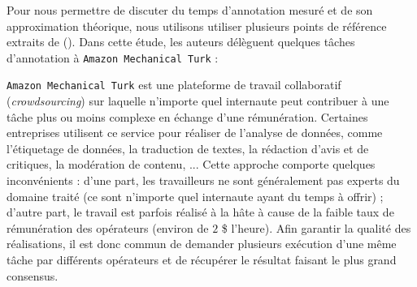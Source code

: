 			Pour nous permettre de discuter du temps d'annotation mesuré et de son approximation théorique, nous utilisons utiliser plusieurs points de référence extraits de (\cite{snow-etal:2008:cheap-fast-it}).
			Dans cette étude, les auteurs délèguent quelques tâches d'annotation à \texttt{Amazon Mechanical Turk} :
			
			\begin{leftBarInformation}
				\texttt{Amazon Mechanical Turk} est une plateforme de travail collaboratif (\textit{crowdsourcing}) sur laquelle n'importe quel internaute peut contribuer à une tâche plus ou moins complexe en échange d'une rémunération.
				Certaines entreprises utilisent ce service pour réaliser de l'analyse de données, comme l’étiquetage de données, la traduction de textes, la rédaction d'avis et de critiques, la modération de contenu, ...
				Cette approche comporte quelques inconvénients : d'une part, les travailleurs ne sont généralement pas experts du domaine traité (ce sont n'importe quel internaute ayant du temps  à offrir) ; d'autre part, le travail est parfois réalisé à la hâte à cause de la faible taux de rémunération des opérateurs (environ de $2$ \$ l'heure).
				Afin garantir la qualité des réalisations, il est donc commun de demander plusieurs exécution d'une même tâche par différents opérateurs et de récupérer le résultat faisant le plus grand consensus.
			\end{leftBarInformation}
			
